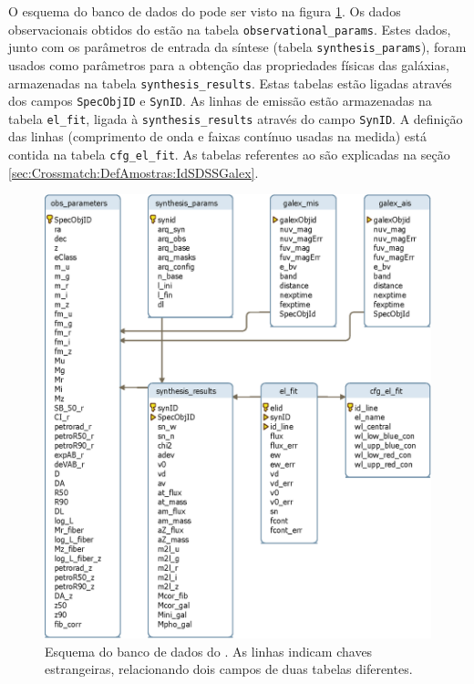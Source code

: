 O esquema do banco de dados do \starlight pode ser visto na figura
\ref{fig:EsquemaBDStarlight}. Os dados observacionais obtidos do \SDSS estão na
tabela \texttt{observational\_params}. Estes dados, junto com os parâmetros de
entrada da síntese (tabela \texttt{synthesis\_params}), foram usados como
parâmetros para a obtenção das propriedades físicas das galáxias, armazenadas na
tabela \texttt{synthesis\_results}. Estas tabelas estão ligadas através dos
campos \texttt{SpecObjID} e \texttt{SynID}. As linhas de emissão estão
armazenadas na tabela \texttt{el\_fit}, ligada à \texttt{synthesis\_results}
através do campo \texttt{SynID}. A definição das linhas (comprimento de onda e
faixas contínuo usadas na medida) está contida na tabela \texttt{cfg\_el\_fit}.
As tabelas referentes ao \galex são explicadas na seção
\ref{sec:Crossmatch:DefAmostras:IdSDSSGalex}.

\begin{figure}
	\includegraphics{figuras/starlight-schema.eps}
	\caption[Esquema do banco de dados do \starlight.]
	{Esquema do banco de dados do \starlight. As linhas indicam chaves
	estrangeiras, relacionando dois campos de duas tabelas diferentes.}
	\label{fig:EsquemaBDStarlight}
\end{figure}

